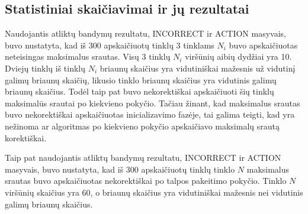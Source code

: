 \subsection{Statistiniai skaičiavimai ir jų rezultatai}

Naudojantis atliktų bandymų rezultatu, INCORRECT ir ACTION masyvais, buvo nustatyta, kad iš 300 apskaičiuotų tinklų 3 tinklams $N_i$ buvo apskaičiuotas neteisingas maksimalus srautas. Visų 3 tinklų $N_i$ viršūnių aibių dydžiai yra 10. Dviejų tinklų iš tinklų $N_i$ briaunų skaičius yra vidutiniškai mažesnis už vidutinį galimų briaunų skaičių, likusio tinklo briaunų skaičius yra vidutinis galimų briaunų skaičius. Todėl taip pat buvo nekorektiškai apskaičiuoti šių tinklų maksimalūs srautai po kiekvieno pokyčio. Tačiau žinant, kad maksimalus srautas buvo nekorektiškai apskaičiuotas inicializavimo fazėje, tai galima teigti, kad yra nežinoma ar algoritmas po kiekvieno pokyčio apskaičiavo maksimalų srautą korektiškai.

Taip pat naudojantis atliktų bandymų rezultatu, INCORRECT ir ACTION masyvais, buvo nustatyta, kad iš 300 apskaičiuotų tinklų tinklo $N$ maksimalus srautas buvo apskaičiuotas nekorektiškai po talpos pakeitimo pokyčio. Tinklo $N$ viršūnių skaičius yra 60, o briaunų skaičius yra vidutiniškai mažesnis nei vidutinis galimų briaunų skaičius.

